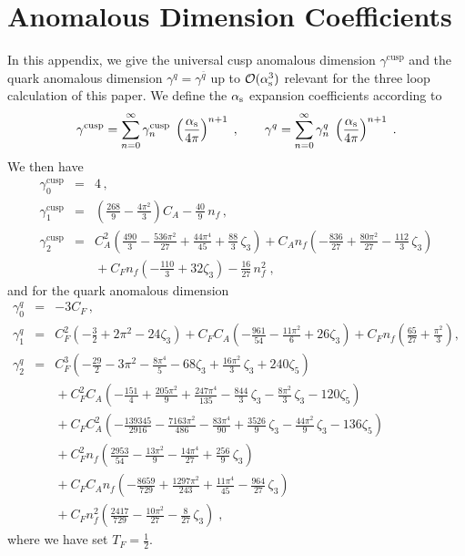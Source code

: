 
\section{Anomalous Dimension Coefficients}
\label{sec:appA}
In this appendix, we give the universal cusp anomalous dimension $\gamma^\text{cusp}$ and the quark anomalous dimension $\gamma^q = \gamma^{\bar q}$ up to $\mathcal{O}(\alpha_\mathrm{s}^3)$ relevant for the three loop calculation of this paper.
We define the $\alpha_\mathrm{s}$ expansion coefficients according to
\begin{equation}
\gamma^\text{cusp}=\sum_{n=0}^\infty \gamma^\text{cusp}_n \;  \left( \frac{\alpha_\mathrm{s}}{4 \pi} \right)^{n+1}\; , \quad \quad \gamma^{q}=\sum_{n=0}^\infty \gamma^{q}_n \;  \left( \frac{\alpha_\mathrm{s}}{4 \pi} \right)^{n+1}\; .
\end{equation}
We then have~\cite{Moch:2004pa,Vogt:2004mw}
\begin{eqnarray}
   \gamma_0^\text{cusp} &=& 4 \,, \nonumber\\
   \gamma_1^\text{cusp} &=& \left( \frac{268}{9} 
    - \frac{4\pi^2}{3} \right) C_A - \frac{40}{9}\, n_f \,,
    \nonumber\\
   \gamma_2^\text{cusp} &=& C_A^2 \left( \frac{490}{3} 
    - \frac{536\pi^2}{27}
    + \frac{44\pi^4}{45} + \frac{88}{3}\,\zeta_3 \right) 
    + C_A  n_f  \left( - \frac{836}{27} + \frac{80\pi^2}{27}
    - \frac{112}{3}\,\zeta_3 \right) \nonumber\\
   &&\mbox{}+ C_F n_f \left( - \frac{110}{3} + 32\zeta_3 \right) 
    - \frac{16}{27}\, n_f^2 \; ,
\end{eqnarray}
and for the quark anomalous dimension~\cite{Moch:2005id,Moch:2005tm}
\begin{eqnarray}
   \gamma_0^q &=& -3 C_F \,, \nonumber\\
   \gamma_1^q &=& C_F^2 \left( -\frac{3}{2} + 2\pi^2
    - 24\zeta_3 \right)
    + C_F C_A \left( - \frac{961}{54} - \frac{11\pi^2}{6} 
    + 26\zeta_3 \right)
    + C_F  n_f \left( \frac{65}{27} + \frac{\pi^2}{3} \right) ,
    \nonumber\\
   \gamma_2^q &=& C_F^3 \left( -\frac{29}{2} - 3\pi^2
    - \frac{8\pi^4}{5}
    - 68\zeta_3 + \frac{16\pi^2}{3}\,\zeta_3 + 240\zeta_5 \right) 
    \nonumber\\
   &&\mbox{}+ C_F^2 C_A \left( - \frac{151}{4} + \frac{205\pi^2}{9}
    + \frac{247\pi^4}{135} - \frac{844}{3}\,\zeta_3
    - \frac{8\pi^2}{3}\,\zeta_3 - 120\zeta_5 \right) \nonumber\\
   &&\mbox{}+ C_F C_A^2 \left( - \frac{139345}{2916} - \frac{7163\pi^2}{486}
    - \frac{83\pi^4}{90} + \frac{3526}{9}\,\zeta_3
    - \frac{44\pi^2}{9}\,\zeta_3 - 136\zeta_5 \right) \nonumber\\
   &&\mbox{}+ C_F^2  n_f \left( \frac{2953}{54} - \frac{13\pi^2}{9} 
    - \frac{14\pi^4}{27} + \frac{256}{9}\,\zeta_3 \right) 
    \nonumber\\
   &&\mbox{}+ C_F C_A n_f \left( - \frac{8659}{729}
    + \frac{1297\pi^2}{243} + \frac{11\pi^4}{45} 
    - \frac{964}{27}\,\zeta_3 \right) \nonumber\\
   &&\mbox{}+ C_F  n_f^2 \left( \frac{2417}{729} 
    - \frac{10\pi^2}{27} - \frac{8}{27}\,\zeta_3 \right) \; ,
\end{eqnarray}
where we have set $T_F = \frac{1}{2}$.
